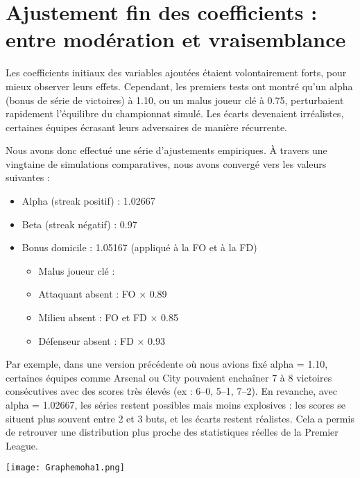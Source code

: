 \documentclass[12pt]{report}
\begin{document}
\section{Ajustement fin des coefficients : entre modération et vraisemblance}

Les coefficients initiaux des variables ajoutées étaient volontairement forts, pour mieux observer leurs effets. Cependant, les premiers tests ont montré qu’un alpha (bonus de série de victoires) à 1.10, ou un malus joueur clé à 0.75, perturbaient rapidement l’équilibre du championnat simulé. Les écarts devenaient irréalistes, certaines équipes écrasant leurs adversaires de manière récurrente.

Nous avons donc effectué une série d’ajustements empiriques. À travers une vingtaine de simulations comparatives, nous avons convergé vers les valeurs suivantes :
\begin{itemize}
  \item Alpha (streak positif) : 1.02667
  \item Beta (streak négatif) : 0.97
  \item Bonus domicile : 1.05167 (appliqué à la FO et à la FD)
  \begin{itemize}
      \item Malus joueur clé :
      \item Attaquant absent : FO × 0.89
      \item Milieu absent : FO et FD × 0.85
      \item Défenseur absent : FD × 0.93
  \end{itemize}

\end{itemize}


Par exemple, dans une version précédente où nous avions fixé alpha = 1.10, certaines équipes comme Arsenal ou City pouvaient enchaîner 7 à 8 victoires consécutives avec des scores très élevés (ex : 6–0, 5–1, 7–2). En revanche, avec alpha = 1.02667, les séries restent possibles mais moins explosives : les scores se situent plus souvent entre 2 et 3 buts, et les écarts restent réalistes. Cela a permis de retrouver une distribution plus proche des statistiques réelles de la Premier League.

\begin{tcolorbox}[
  colback=white, colframe=green!60!black,
  title=\textcolor{white}{\textbf{Impact d’un paramètre sur la FO simulée}},
  coltitle=white, colbacktitle=green!60!black,
  boxrule=0.8pt,
  left=4pt, right=4pt, top=5pt, bottom=5pt,
  boxsep=5pt,
  enhanced, sharp corners
]
\centering
\texttt{[image: Graphemoha1.png]}
\label{fig:photo_label}
\end{tcolorbox}
\end{document}
